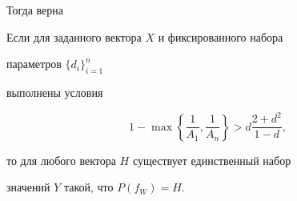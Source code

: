 Тогда верна 





\begin{thm} \label{sredn}


Если для заданного вектора $X$ и фиксированного набора


параметров $\{d_i\}_{i=1}^n$


выполнены условия


\begin{equation} \label{usl_sredn}


1 - \max \left\{ \frac{1}{A_1}, \frac{1}{A_n} \right\} >


d \frac{2+d^2 }{1-d} ,


\end{equation}


то для любого вектора $H$ существует единственный набор


значений $Y$ такой, что $ P(f_W) = H$.


\end{thm}





